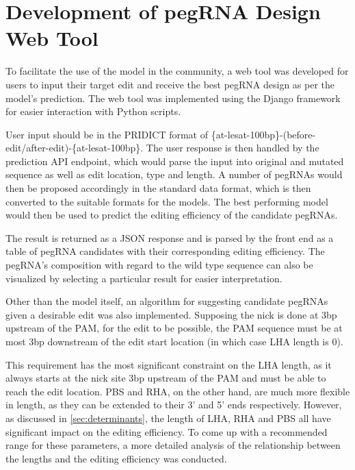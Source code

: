 \section{Development of pegRNA Design Web Tool}

To facilitate the use of the model in the community, a web tool was developed for users to input their target edit and receive the best pegRNA design as per the model's prediction. The web tool was implemented using the Django framework for easier interaction with Python scripts. 

User input should be in the PRIDICT format of \{at-lesat-100bp\}-(before-edit/after-edit)-\{at-lesat-100bp\}. The user response is then handled by the prediction API endpoint, which would parse the input into original and mutated sequence as well as edit location, type and length. A number of pegRNAs would then be proposed accordingly in the standard data format, which is then converted to the suitable formats for the models. The best performing model would then be used to predict the editing efficiency of the candidate pegRNAs. 


The result is returned as a JSON response and is parsed by the front end as a table of pegRNA candidates with their corresponding editing efficiency. The pegRNA's composition with regard to the wild type sequence can also be visualized by selecting a particular result for easier interpretation.

Other than the model itself, an algorithm for suggesting candidate pegRNAs given a desirable edit was also implemented. Supposing the nick is done at 3bp upstream of the PAM, for the edit to be possible, the PAM sequence must be at most 3bp downstream of the edit start location (in which case LHA length is 0). 

This requirement has the most significant constraint on the LHA length, as it always starts at the nick site 3bp upstream of the PAM and must be able to reach the edit location. PBS and RHA, on the other hand, are much more flexible in length, as they can be extended to their 3' and 5' ends respectively.
However, as discussed in \autoref{sec:determinants}, the length of LHA, RHA and PBS all have significant impact on the editing efficiency. To come up with a recommended range for these parameters, a more detailed analysis of the relationship between the lengths and the editing efficiency was conducted.

